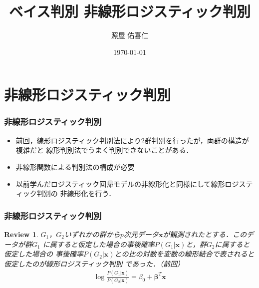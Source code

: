 \documentclass[dvipdfmx,cjk]{beamer}
\theoremstyle{example}
\newtheorem{review}[thm]{Review}
\begin{document}
\title[多変量解析]{ベイス判別 非線形ロジスティック判別}
\author[]{照屋 佑喜仁}
\institute[]{}
\date{\today}

\begin{frame}
    \titlepage
\end{frame}

\begin{frame}
    \tableofcontents
\end{frame}

\section{非線形ロジスティック判別}
\begin{frame}
    \frametitle{非線形ロジスティック判別} %
    \begin{itemize}
        \item 前回，線形ロジスティック判別法により2群判別を行ったが，両群の構造が複雑だと
              線形判別法でうまく判別できないことがある．
        \item \alert{非線形関数}による判別法の構成が必要
        \item 以前学んだロジスティック回帰モデルの非線形化と同様にして線形ロジスティック判別の
              非線形化を行う．
    \end{itemize}
\end{frame}
\begin{frame}
    \frametitle{非線形ロジスティック判別}
    \begin{review}
        $G_1$，$G_2$いずれかの群から$p$次元データ$\boldsymbol{x}$が観測されたとする．このデータが群$G_1$
        に属すると仮定した場合の事後確率$P(G_1|\boldsymbol{x})$と，群$G_2$に属すると仮定した場合の
        事後確率$P(G_2|\boldsymbol{x})$との比の対数を変数の線形結合で表されると仮定したのが線形ロジスティック判別
        であった．（前回）
        \begin{align*}
            \log \frac{P(G_1|\boldsymbol{x})}{P(G_2|\boldsymbol{x})}=\beta_0+\boldsymbol{\beta}^T\boldsymbol{x}
        \end{align*}
    \end{review}
\end{frame}
\end{document}
